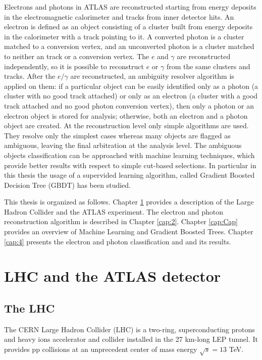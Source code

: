 \documentclass[a4paper, oneside, 11pt, openright]{book}
\begin{document}
		Electrons and photons in ATLAS are reconstructed starting from energy deposits in the electromagnetic calorimeter and tracks from inner detector hits. An electron is defined as an object consisting of a cluster built from energy deposits in the calorimeter with a track pointing to it. A converted photon is a cluster matched to a conversion vertex, and an unconverted photon is a cluster matched to neither an track or a conversion vertex. The $e$ and $\gamma$ are reconstructed independently, so it is possible to reconstruct $e$ or $\gamma$ from the same clusters and tracks. After the $e/\gamma$ are reconstructed, an ambiguity resolver algorithm is applied on them: if a particular object can be easily identified only as a photon (a cluster with no good track attached) or only as an electron (a cluster with a good track attached and no good photon conversion vertex), then only a photon or an electron object is stored for analysis; otherwise, both an electron and a photon object are created. At the reconstruction level only simple algorithms are used. They resolve only the simplest cases whereas many objects are flagged as ambiguous, leaving the final arbitration at the analysis level. The ambiguous objects classification can be approached with machine learning techniques, which provide better results with respect to simple cut-based selections. In particular in this thesis the usage of a supervided learning algorithm, called Gradient Boosted  Decision Tree (GBDT) has been studied.
		
		This thesis is organized as follows. Chapter \ref{cap:1} provides a description of the Large Hadron Collider and the ATLAS experiment. The electron and photon reconstruction algorithm is described in Chapter \ref{cap:2}. Chapter \ref{cap:Cap} provides an overview of Machine Learning and Gradient Boosted Trees. Chapter \ref{cap:4} presents the electron and photon classification and and its results. 
	
	
	
	\chapter{LHC and the ATLAS detector} \label{cap:1}
		\section{The LHC}
			The CERN Large Hadron Collider (LHC) \cite{LHC design} is a two-ring, superconducting protons and heavy ions accelerator and collider installed in the 27 km-long LEP tunnel. It provides pp collisions at an unprecedent center of mass energy $\sqrt{s} = 13$ TeV.
			
\end{document}
